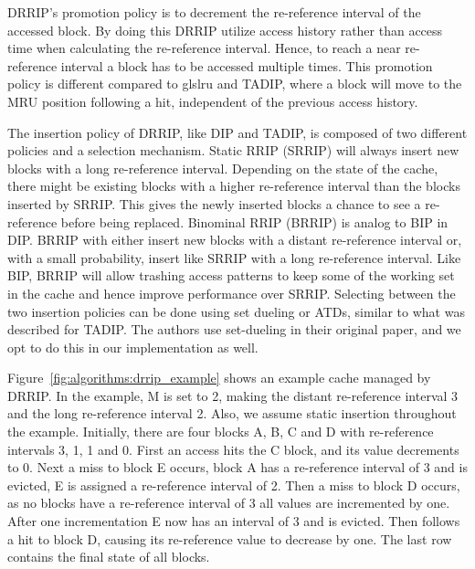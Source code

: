 DRRIP's promotion policy is to decrement the re-reference interval of the accessed block.
By doing this DRRIP utilize access history rather than access time when calculating the re-reference interval.
Hence, to reach a near re-reference interval a block has to be accessed multiple times.
This promotion policy is different compared to gls{lru} and TADIP, where a block will move to the MRU position following a hit, independent of the previous access history.

The insertion policy of DRRIP, like DIP and TADIP, is composed of two different policies and a selection mechanism.
Static RRIP (SRRIP) will always insert new blocks with a long re-reference interval. 
Depending on the state of the cache, there might be existing blocks with a higher re-reference interval than the blocks inserted by SRRIP.
This gives the newly inserted blocks a chance to see a re-reference before being replaced.
Binominal RRIP (BRRIP) is analog to BIP in DIP.
BRRIP with either insert new blocks with a distant re-reference interval or, with a small probability, insert like SRRIP with a long re-reference interval.
Like BIP, BRRIP will allow trashing access patterns to keep some of the working set in the cache and hence improve performance over SRRIP.
Selecting between the two insertion policies can be done using set dueling or ATDs, similar to what was described for TADIP.
The authors use set-dueling in their original paper, and we opt to do this in our implementation as well.

Figure~\ref{fig:algorithms:drrip_example} shows an example cache managed by DRRIP.
In the example, M is set to 2, making the distant re-reference interval 3 and the long re-reference interval 2. 
Also, we assume static insertion throughout the example.
Initially, there are four blocks A, B, C and D with re-reference intervals 3, 1, 1 and 0.
First an access hits the C block, and its value decrements to 0.
Next a miss to block E occurs, block A has a re-reference interval of 3 and is evicted, E is assigned a re-reference interval of 2.
Then a miss to block D occurs, as no blocks have a re-reference interval of 3 all values are incremented by one.
After one incrementation E now has an interval of 3 and is evicted.
Then follows a hit to block D, causing its re-reference value to decrease by one.
The last row contains the final state of all blocks.